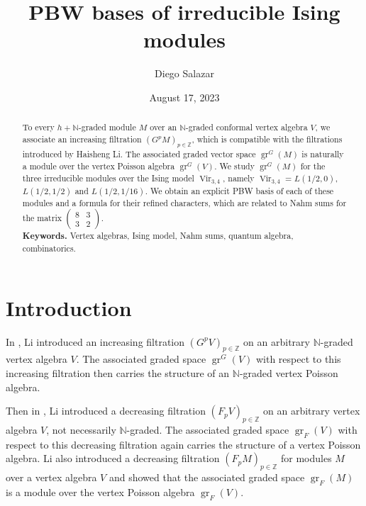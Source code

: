 \documentclass[a4paper, 12pt, reqno]{amsart}
\theoremstyle{remark}
\DeclareMathOperator{\Vir}{Vir}
\DeclareMathOperator{\gr}{gr}
\begin{document}
\setcounter{section}{-1}

\begin{abstract}
  To every $h + \mathbb{N}$-graded module $M$ over an $\mathbb{N}$-graded conformal vertex algebra $V$, we associate an increasing filtration $(G^pM)_{p \in \mathbb{Z}}$, which is compatible with the filtrations introduced by Haisheng Li.
  The associated graded vector space $\gr^G(M)$ is naturally a module over the vertex Poisson algebra $\gr^G(V)$.
  We study $\gr^G(M)$ for the three irreducible modules over the Ising model $\Vir_{3, 4}$, namely $\Vir_{3,4} = L(1/2, 0)$, $L(1/2, 1/2)$ and $L(1/2, 1/16)$.
  We obtain an explicit PBW basis of each of these modules and a formula for their refined characters, which are related to Nahm sums for the matrix $\left(\begin{smallmatrix} 8 & 3 \\ 3 & 2 \end{smallmatrix}\right)$. \\
  \smallskip
  \noindent \textbf{Keywords.} Vertex algebras, Ising model, Nahm sums, quantum algebra, combinatorics.
\end{abstract}

\title{PBW bases of irreducible Ising modules}
\author{Diego Salazar}
\address{Instituto de Matemática Pura e Aplicada, Rio de Janeiro, RJ, Brazil}
\date{August 17, 2023}
\maketitle

\section{Introduction}
\label{sec:introduction}

In \cite{li_vertex_2004}, Li introduced an increasing filtration $(G^pV)_{p \in \mathbb{Z}}$ on an arbitrary $\mathbb{N}$-graded vertex algebra $V$.
The associated graded space $\gr^G(V)$ with respect to this increasing filtration then carries the structure of an $\mathbb{N}$-graded vertex Poisson algebra.

Then in \cite{li_abelianizing_2005}, Li introduced a decreasing filtration $(F_pV)_{p \in \mathbb{Z}}$ on an arbitrary vertex algebra $V$, not necessarily $\mathbb{N}$-graded.
The associated graded space $\gr_F(V)$ with respect to this decreasing filtration again carries the structure of a vertex Poisson algebra.
Li also introduced a decreasing filtration $(F_pM)_{p \in \mathbb{Z}}$ for modules $M$ over a vertex algebra $V$ and showed that the associated graded space $\gr_F(M)$ is a module over the vertex Poisson algebra $\gr_F(V)$.
\end{document}
